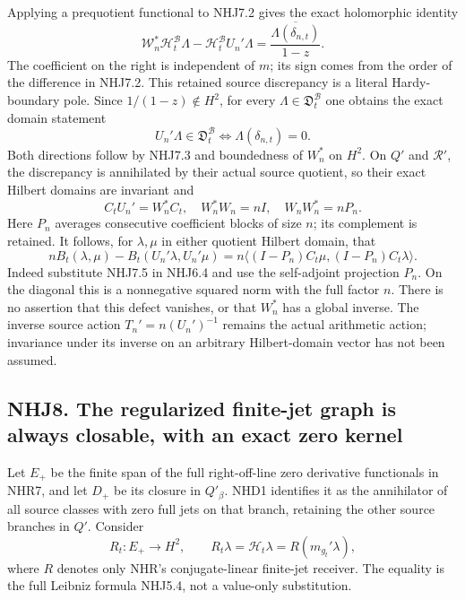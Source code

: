 Applying a prequotient functional to NHJ7.2 gives the exact holomorphic
identity \[
\boxed{\mathscr W_n^*\mathcal H_t^{\mathcal B}\Lambda
-\mathcal H_t^{\mathcal B}U_n'\Lambda
=\frac{\overline{\Lambda(\delta_{n,t})}}{1-z}.}
\tag{NHJ7.3}
\] The coefficient on the right is independent of \(m\); its sign comes
from the order of the difference in NHJ7.2. This retained source
discrepancy is a literal Hardy-boundary pole. Since
\(1/(1-z)\notin H^2\), for every
\(\Lambda\in\mathfrak D_t^{\mathcal B}\) one obtains the exact domain
statement \[
\boxed{U_n'\Lambda\in\mathfrak D_t^{\mathcal B}
\iff\Lambda(\delta_{n,t})=0.}
\tag{NHJ7.4}
\] Both directions follow by NHJ7.3 and boundedness of \(W_n^*\) on
\(H^2\). On \(Q'\) and \(\mathcal R'\), the discrepancy is annihilated
by their actual source quotient, so their exact Hilbert domains are
invariant and \[
C_t U_n'=W_n^*C_t,
\quad W_n^*W_n=nI,
\quad W_nW_n^*=nP_n.
\tag{NHJ7.5}
\] Here \(P_n\) averages consecutive coefficient blocks of size \(n\);
its complement is retained. It follows, for \(\lambda,\mu\) in either
quotient Hilbert domain, that \[
nB_t(\lambda,\mu)-B_t(U_n'\lambda,U_n'\mu)
=n\langle(I-P_n)C_t\mu,(I-P_n)C_t\lambda\rangle.
\tag{NHJ7.6}
\] Indeed substitute NHJ7.5 in NHJ6.4 and use the self-adjoint
projection \(P_n\). On the diagonal this is a nonnegative squared norm
with the full factor \(n\). There is no assertion that this defect
vanishes, or that \(W_n^*\) has a global inverse. The inverse source
action \(T_n'=n(U_n')^{-1}\) remains the actual arithmetic action;
invariance under its inverse on an arbitrary Hilbert-domain vector has
not been assumed.

\subsection{NHJ8. The regularized finite-jet graph is always closable,
with an exact zero
kernel}\label{nhj8.-the-regularized-finite-jet-graph-is-always-closable-with-an-exact-zero-kernel}

Let \(E_+\) be the finite span of the full right-off-line zero
derivative functionals in NHR7, and let \(D_+\) be its closure in
\(Q'_\beta\). NHD1 identifies it as the annihilator of all source
classes with zero full jets on that branch, retaining the other source
branches in \(Q'\). Consider \[
R_t:E_+\to H^2,\qquad R_t\lambda=\mathcal H_t\lambda
=R(m_{g_t}'\lambda),
\tag{NHJ8.1}
\] where \(R\) denotes only NHR's conjugate-linear finite-jet receiver.
The equality is the full Leibniz formula NHJ5.4, not a value-only
substitution.

